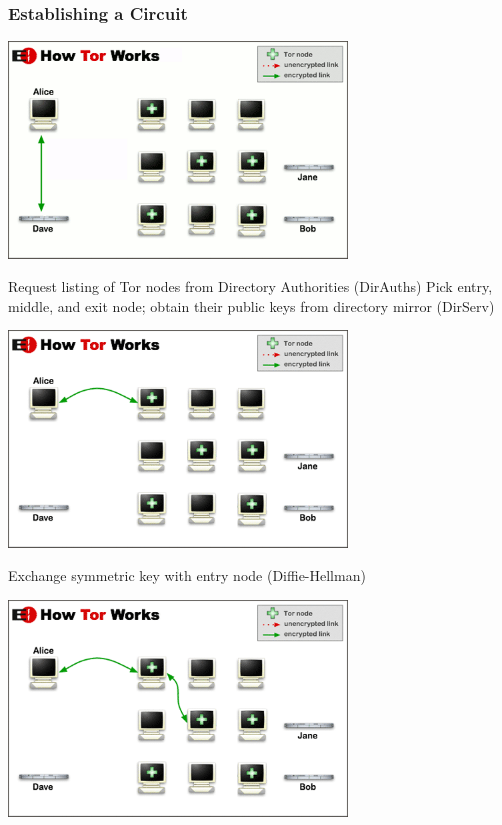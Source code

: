 \begin{frame}
  \frametitle{Establishing a Circuit}
  {
    \begin{center}
      \includegraphics[width=9cm]{tor1}
    \end{center}
    {
      Request listing of Tor nodes from Directory Authorities (DirAuths)
    }
    {
    Pick entry, middle, and exit node; obtain their public keys from directory
    mirror (DirServ)
    }
  }
  {
    \begin{center}
      \includegraphics[width=9cm]{tor2}
    \end{center}
    Exchange symmetric key with entry node (Diffie-Hellman)
  }
  {
    \begin{center}
      \includegraphics[width=9cm]{tor3}
    \end{center}
}
\end{frame}
